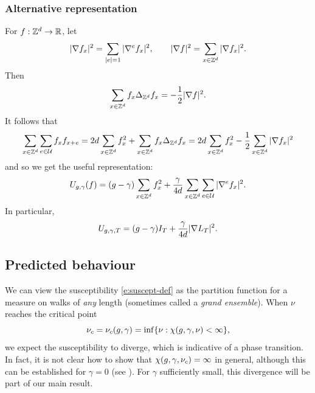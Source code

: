 \subsubsection{Alternative representation}

For $f : { {{\mathbb Z}}^d } \rightarrow {\mathbb R}$, let 
\begin{equation}
|\nabla f_x|^2 = \sum_{|e|=1} |\nabla^e f_x|^2,
	\qquad
|\nabla f|^2 = \sum_{x\in{ {{\mathbb Z}}^d }} |\nabla f_x|^2.
\end{equation}
Then
\begin{equation}
\label{e:sbp}
\sum_{x\in{ {{\mathbb Z}}^d }}   f_x \Delta_{{ {{\mathbb Z}}^d }} f_x
=
-\frac{1}{2} |\nabla f|^2.
\end{equation}
It follows that
\begin{equation}
\sum_{x\in{ {{\mathbb Z}}^d }} \sum_{e\in\mathcal{U}} f_x f_{x+e}
=
2 d \sum_{x\in{ {{\mathbb Z}}^d }} f_x^2
+ \sum_{x\in{ {{\mathbb Z}}^d }} f_x \Delta_{{ {{\mathbb Z}}^d }} f_x
=
2 d \sum_{x\in{ {{\mathbb Z}}^d }} f_x^2
- \frac{1}{2} \sum_{x\in{ {{\mathbb Z}}^d }} |\nabla f_x|^2
\end{equation}
and so we get the useful representation:
\begin{equation}
\label{e:Udef-pos}
U_{g,\gamma}(f)
= (g - \gamma) \sum_{x\in{ {{\mathbb Z}}^d }} f_x^2
+ \frac{\gamma}{4d} \sum_{x\in{ {{\mathbb Z}}^d }} \sum_{e\in\mathcal{U}} |\nabla^e f_x|^2.
\end{equation}
In particular,
\begin{equation}
  \label{e:V2}
  U_{g,\gamma,T} =
  (g - \gamma) I_T
  + \frac{\gamma}{4d}
  |\nabla L_T|^2
  .
\end{equation}


\subsection{Predicted behaviour}

We can view the susceptibility \eqref{e:suscept-def} as the partition function
for a measure on walks of \emph{any} length (sometimes called a \emph{grand
ensemble}). When $\nu$ reaches the critical point
\begin{equation}
\nu_c = \nu_c(g, \gamma) = \inf\{ \nu : \chi(g,\gamma,\nu) < \infty \},
\end{equation}
we expect the susceptibility to diverge, which is indicative of a phase transition.
In fact, it is not clear how to show that $\chi(g,\gamma,\nu_c) = \infty$ in
general, although this can be established for $\gamma = 0$
(see \cite[Lemma~\ref{log-lem:csub}]{BBS-saw4-log}). For $\gamma$
sufficiently small, this divergence will be part of our main result.

